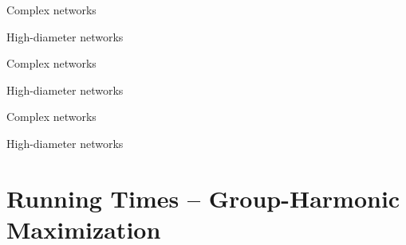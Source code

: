 \begin{table}[tb]
\footnotesize\centering
{}
\label{tab:gh-gc-apx:small-inst-gc}
\begin{subtable}[t]{.45\textwidth}
\centering
\caption{Complex networks}

\end{subtable}\hfill
\begin{subtable}[t]{.45\textwidth}
\centering
\caption{High-diameter networks}

\end{subtable}
\end{table}

\begin{table}[tb]
\footnotesize
{}
\label{tab:gh-gc-apx:large-inst-gh}
\begin{subtable}[t]{.45\textwidth}
\caption{Complex networks}
\label{tab:gh-gc-apx:large-inst-gh-cplx}

\end{subtable}\hfill
\begin{subtable}[t]{.45\textwidth}
\caption{High-diameter networks}
\label{tab:gh-gc-apx:large-inst-gh-high-diam}

\end{subtable}
\end{table}

\begin{table}[tb]
\footnotesize
{}
\label{tab:gh-gc-apx:large-inst-gc}
\begin{subtable}[t]{.45\textwidth}
\caption{Complex networks}
\label{tab:gh-gc-apx:large-inst-gc-cplx}

\end{subtable}\hfill
\begin{subtable}[t]{.45\textwidth}
\caption{High-diameter networks}
\label{tab:gh-gc-apx:large-inst-gc-high-diam}

\end{subtable}
\end{table}

\FloatBarrier

\section{Running Times -- Group-Harmonic Maximization}
\label{sec:gh-gc:running-times-gh}

